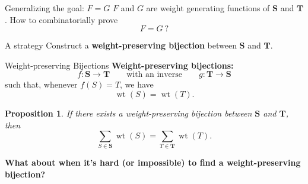 \documentclass[aspectratio = 1609]{beamer}
\newtheorem{prop}{Proposition}
\theoremstyle{definition}
\theoremstyle{plain} %
\begin{document}
\begin{frame}{Generalizing the goal: $F = G$}
  $F$ and $G$ are weight generating functions of $\textbf{S}$ and $\textbf{T}$.
  How to combinatorially prove \[ F = G \ ? \]

  \pause

  \begin{block}{A strategy}
    Construct a \textbf{weight-preserving bijection} between $\textbf{S}$ and $\textbf{T}$.
  \end{block}
\end{frame}

\begin{frame}{Weight-preserving Bijections}
  \textbf{Weight-preserving bijections:}
  \[
    f \colon \textbf{S} \to \textbf{T} \qquad \text{with an inverse} \qquad g \colon \textbf{T} \to \textbf{S}
  \]
  such that, whenever $f(S) = T$, we have
  \[ \operatorname{wt}(S) = \operatorname{wt}(T). \]

  \vspace{-.75em}
  \pause

  \begin{prop}
    If there exists a weight-preserving bijection between \(\mathbf{S}\) and \(\mathbf{T}\), then
    \[ \sum_{S \in \mathbf{S}} \operatorname{wt}(S) = \sum_{T \in \mathbf{T}} \operatorname{wt}(T). \]
  \end{prop}

  \pause

  \begin{center}
  \textbf{What about when it's hard (or impossible) to find a weight-preserving bijection?}
  \end{center}
\end{frame}
\end{document}
